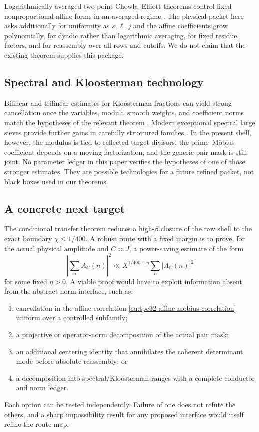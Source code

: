 Logarithmically averaged two-point Chowla--Elliott theorems control fixed
nonproportional affine forms in an averaged regime \citep{Tao2016}.  The
physical packet here asks additionally for uniformity as $s,\ell,j$ and the
affine coefficients grow polynomially, for dyadic rather than logarithmic
averaging, for fixed residue factors, and for reassembly over all rows and
cutoffs.  We do not claim that the existing theorem supplies this package.

\subsection{Spectral and Kloosterman technology}

Bilinear and trilinear estimates for Kloosterman fractions can yield strong
cancellation once the variables, moduli, smooth weights, and coefficient
norms match the hypotheses of the relevant theorem
\citep{DukeFriedlanderIwaniec1997,BettinChandee2018}.  Modern exceptional
spectral large sieves provide further gains in carefully structured
families \citep{Pascadi2026LargeSieve}.  In the present shell, however, the
modulus is tied to reflected target divisors, the prime--M\"obius
coefficient depends on a moving factorization, and the generic pair mask is
still joint.  No parameter ledger in this paper verifies the hypotheses of
one of those stronger estimates.  They are possible technologies for a
future refined packet, not black boxes used in our theorems.

\subsection{A concrete next target}

The conditional transfer theorem reduces a high-$\beta$ closure of the raw
shell to the exact boundary $\chi\le1/400$.  A robust route with a fixed
margin is to
prove, for the actual physical amplitude and $C\asymp J$, a power-saving
estimate of the form
\begin{equation}
 \left|\sum_nA_C(n)\right|^2
 \ll X^{1/400-\eta}\sum_n|A_C(n)|^2
 \label{eq:tpc32-next-flatness-target}
\end{equation}
for some fixed $\eta>0$.  A viable proof would have to exploit information
absent from the abstract norm interface, such as:
\begin{enumerate}[label=\textup{(\alph*)}]
 \item cancellation in the affine correlation
 \eqref{eq:tpc32-affine-mobius-correlation} uniform over a controlled
 subfamily;
 \item a projective or operator-norm decomposition of the actual pair mask;
 \item an additional centering identity that annihilates the coherent
 determinant mode before absolute reassembly; or
 \item a decomposition into spectral/Kloosterman ranges with a complete
 conductor and norm ledger.
\end{enumerate}
Each option can be tested independently.  Failure of one does not refute
the others, and a sharp impossibility result for any proposed interface
would itself refine the route map.

